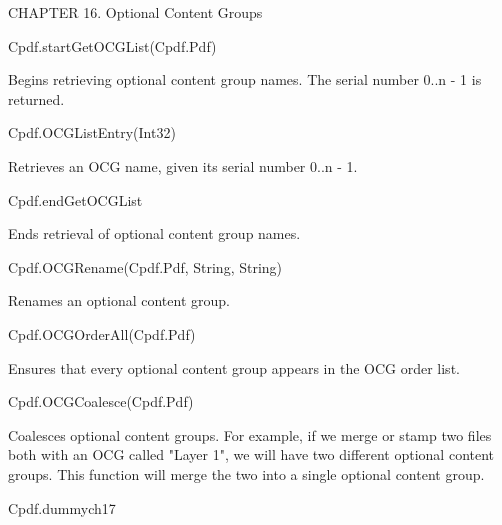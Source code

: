 CHAPTER 16. Optional Content Groups

Cpdf.startGetOCGList(Cpdf.Pdf)

Begins retrieving optional content group names. The serial number 0..n - 1
is returned.

Cpdf.OCGListEntry(Int32)

Retrieves an OCG name, given its serial number 0..n - 1.

Cpdf.endGetOCGList

Ends retrieval of optional content group names.

Cpdf.OCGRename(Cpdf.Pdf, String, String)

Renames an optional content group.

Cpdf.OCGOrderAll(Cpdf.Pdf)

Ensures that every optional content group appears in the OCG order list.

Cpdf.OCGCoalesce(Cpdf.Pdf)

Coalesces optional content groups. For example, if we merge or stamp two
files both with an OCG called "Layer 1", we will have two different optional
content groups. This function will merge the two into a single optional
content group.

Cpdf.dummych17

